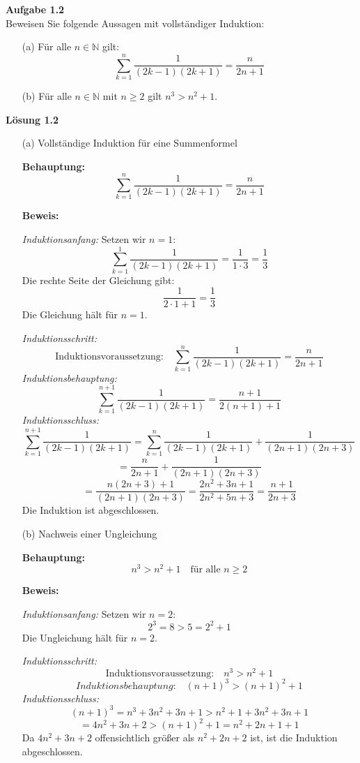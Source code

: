 \documentclass[%
    12pt,
    a4paper,
    ngerman,
    headheight=29.1pt,
]{scrartcl}
\newcommand{\Aufgabe}[1]{
  {
  \vspace*{0.5cm}
  \textsf{\textbf{Aufgabe #1}}
  \vspace*{0.2cm}
  }
}
\newcommand{\Loesung}[1]{
  {
  \vspace*{0.5cm}
  \textsf{\textbf{Lösung #1}}
  \vspace*{0.2cm}
  }
}
\begin{document}
\Aufgabe{1.2} \\
Beweisen Sie folgende Aussagen mit vollständiger Induktion:

\begin{enumerate}
    \item[(a)] Für alle \( n \in \mathbb{N} \) gilt:
    \[
    \sum_{k=1}^{n} \frac{1}{(2k-1)(2k+1)} = \frac{n}{2n+1}
    \]

    \item[(b)] Für alle \( n \in \mathbb{N} \) mit \( n \geq 2 \) gilt \( n^3 > n^2 + 1 \).
\end{enumerate}

\Loesung{1.2} \\
\begin{enumerate}
    \item[(a)] Vollständige Induktion für eine Summenformel
    
    \textbf{Behauptung:}
    \[
    \sum_{k=1}^{n} \frac{1}{(2k-1)(2k+1)} = \frac{n}{2n+1}
    \]

    \textbf{Beweis:}

    \textit{Induktionsanfang:}
    Setzen wir \(n=1\):
    \[
    \sum_{k=1}^{1} \frac{1}{(2k-1)(2k+1)} = \frac{1}{1 \cdot 3} = \frac{1}{3}
    \]
    Die rechte Seite der Gleichung gibt:
    \[
    \frac{1}{2 \cdot 1 + 1} = \frac{1}{3}
    \]
    Die Gleichung hält für \(n=1\).

    \textit{Induktionsschritt:}
    \[
    \text{Induktionsvoraussetzung:} \quad \sum_{k=1}^{n} \frac{1}{(2k-1)(2k+1)} = \frac{n}{2n+1}
    \]
    \textit{Induktionsbehauptung:}
    \[
    \sum_{k=1}^{n+1} \frac{1}{(2k-1)(2k+1)} = \frac{n+1}{2(n+1)+1}
    \]
    \textit{Induktionsschluss:}
    \[
    \sum_{k=1}^{n+1} \frac{1}{(2k-1)(2k+1)} = \sum_{k=1}^{n} \frac{1}{(2k-1)(2k+1)} + \frac{1}{(2n+1)(2n+3)}
    \]
    \[
    = \frac{n}{2n+1} + \frac{1}{(2n+1)(2n+3)}
    \]
    \[
    = \frac{n(2n+3) + 1}{(2n+1)(2n+3)} = \frac{2n^2 + 3n + 1}{2n^2 + 5n + 3} = \frac{n+1}{2n+3}
    \]
    Die Induktion ist abgeschlossen.

    \item[(b)] Nachweis einer Ungleichung
    
    \textbf{Behauptung:}
    \[
    n^3 > n^2 + 1 \quad \text{für alle } n \geq 2
    \]

    \textbf{Beweis:}

    \textit{Induktionsanfang:}
    Setzen wir \(n=2\):
    \[
    2^3 = 8 > 5 = 2^2 + 1
    \]
    Die Ungleichung hält für \(n=2\).

    \textit{Induktionsschritt:}
    \[
    \text{Induktionsvoraussetzung:} \quad n^3 > n^2 + 1
    \]
    \[
    \textit{Induktionsbehauptung:} \quad (n+1)^3 > (n+1)^2 + 1
    \]
    \textit{Induktionsschluss:}
    \[
    (n+1)^3 = n^3 + 3n^2 + 3n + 1 > n^2 + 1 + 3n^2 + 3n + 1
    \]
    \[
    = 4n^2 + 3n + 2 > (n+1)^2 + 1 = n^2 + 2n + 1 + 1
    \]
    Da \(4n^2 + 3n + 2\) offensichtlich größer als \(n^2 + 2n + 2\) ist, ist die Induktion abgeschlossen.
\end{enumerate}
\end{document}
